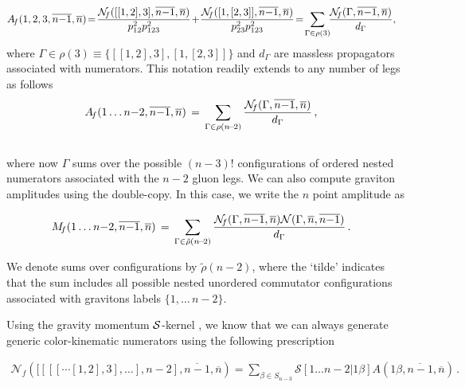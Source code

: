 \documentclass[a4paper,12pt]{article}
\def\sc#1{\overline{#1}}
\newcommand{\npre}{\mathcal{N}}
\newcommand{\commut}{\Gamma}
\begin{document}
\begin{align}
\begin{split}
\label{eq:newDCg}
A_{\!f}(1,2,3,\sc{n{-}1},\sc n)&\! =\! {\npre_{\!f}([[1,2],3],\sc{n{-}1},\sc n)\over p_{12}^2p_{123}^2}\!+\!  {\npre_{\!f}([1,[2,3]],\sc{n{-}1},\sc n)\over p_{23}^2p_{123}^2}\!
=\! \sum_{\commut \in \rho(3)} \!\!{\npre_{\!f}(\commut,\sc{n{-}1},\sc n)\over d_\commut}\!\,,\end{split}
\end{align} 
%
where $\Gamma\in
\rho(3)\equiv\{[[1,2],3],[1,[2,3]]\}$ and $d_\commut$ are massless propagators associated with numerators. This notation readily extends to any number of legs as follows
%
\begin{align}
\begin{split}
\label{eq:newDCg}
	A_{\!f}(1\ldots n{-}2,\sc{n{-}1},\sc n)&\, =\, \sum_{\commut \in \rho(n\!-\!2)} {\npre_{\!f}(\commut,\sc{n{-}1},\sc n)\over d_\commut}\,,
\end{split}
\end{align}
\\[10pt]

where now $\Gamma$ sums over the possible $(n\!-\!3)!$ configurations of ordered nested numerators associated with the $n\!-\!2$ gluon legs.
We can also compute graviton amplitudes using the double-copy. In this case, we write the $n$ point amplitude as

\begin{align}
\begin{split}
\label{eq:newDCgr}
	M_{\!f}(1\ldots n{-}2,\sc{n{-}1},\sc n)&\, =\, \sum_{\commut\in \tilde{\rho}(n\!-\!2)} {\npre_{\!f}(\commut,\sc{n{-}1},\sc n)\npre(\commut,\sc n,\sc{n{-}1}) \over d_\commut}\, .
\end{split}
\end{align}

We denote sums over configurations by $\tilde{\rho}(n\!-\!2)$, where the `tilde' indicates that the sum includes all possible nested unordered commutator configurations associated with gravitons labels $\{ 1, \ldots \, n{-}2 \}$.

Using the gravity momentum ${\cal S}$-kernel \cite{Bjerrum-Bohr:2010diw,Bjerrum-Bohr:2010pnr,Bjerrum-Bohr:2010mia,Bjerrum-Bohr:2010kyi,Bjerrum-Bohr:2010mtb}, we know that we can always generate generic color-kinematic numerators using the following prescription  \cite{Bjerrum-Bohr:2010pnr,Bjerrum-Bohr:2012kaa}

\begin{align}\label{eq:KLT}
\!\!\!\!   \npre_{\!f}([[[[\cdots[1,2],3],\ldots], n\!-\!2],\sc{n\!-\!1},\sc{n})\!=\! \sum_{\beta\in S_{n\!-\!3}} \mathcal{S}[1\ldots n\!-\!2 |1\beta ]A(1\beta,\sc{n\!-\!1},\sc{n}) \,.
\end{align}
\end{document}

